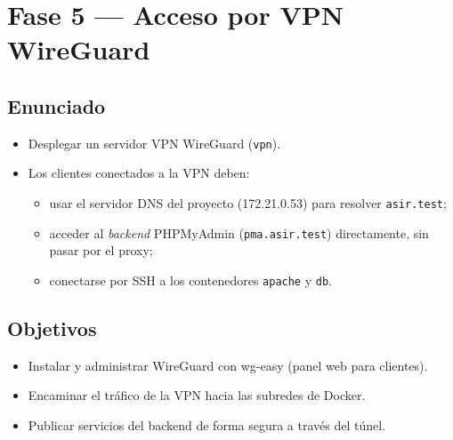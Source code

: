 \documentclass[11pt]{article}
\begin{document}
\section{Fase 5 — Acceso por VPN WireGuard}
\label{sec:org0000069}

\subsection{Enunciado}
\label{sec:org000005a}
\begin{itemize}
\item Desplegar un servidor VPN WireGuard (\texttt{vpn}).
\item Los clientes conectados a la VPN deben:
\begin{itemize}
\item usar el servidor DNS del proyecto (172.21.0.53) para resolver \texttt{asir.test};
\item acceder al \emph{backend} PHPMyAdmin (\texttt{pma.asir.test}) directamente, sin pasar por
el proxy;
\item conectarse por SSH a los contenedores \texttt{apache} y \texttt{db}.
\end{itemize}
\end{itemize}
\subsection{Objetivos}
\label{sec:org000005d}
\begin{itemize}
\item Instalar y administrar WireGuard con wg-easy (panel web para clientes).
\item Encaminar el tráfico de la VPN hacia las subredes de Docker.
\item Publicar servicios del backend de forma segura a través del túnel.
\end{itemize}
\end{document}
